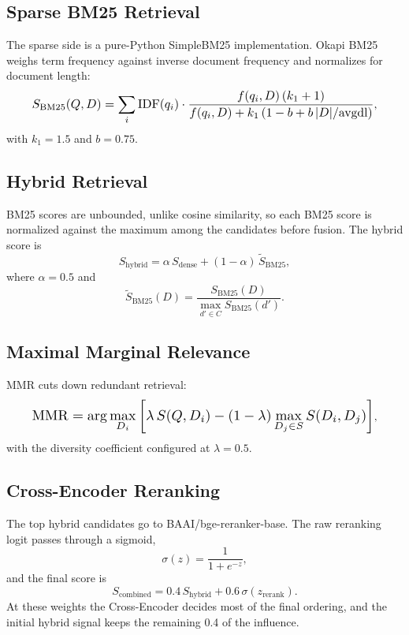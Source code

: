 \documentclass[10pt,twocolumn,letterpaper]{article}
\begin{document}
\subsection{Sparse BM25 Retrieval}
The sparse side is a pure-Python SimpleBM25 implementation. Okapi BM25 weighs term frequency against inverse document frequency and normalizes for document length:
\begin{equation}
\resizebox{0.9\columnwidth}{!}{$\displaystyle S_{\mathrm{BM25}}(Q, D) = \sum_i \mathrm{IDF}(q_i) \cdot \frac{f(q_i, D)\,(k_1 + 1)}{f(q_i, D) + k_1\,(1 - b + b\,|D|/\mathrm{avgdl})}$},
\end{equation}
with $k_1 = 1.5$ and $b = 0.75$.

\subsection{Hybrid Retrieval}
BM25 scores are unbounded, unlike cosine similarity, so each BM25 score is normalized against the maximum among the candidates before fusion. The hybrid score is
\begin{equation}
S_{\mathrm{hybrid}} = \alpha\, S_{\mathrm{dense}} + (1 - \alpha)\, \tilde{S}_{\mathrm{BM25}},
\end{equation}
where $\alpha = 0.5$ and
\begin{equation}
\tilde{S}_{\mathrm{BM25}}(D) = \frac{S_{\mathrm{BM25}}(D)}{\max_{d' \in C} S_{\mathrm{BM25}}(d')}.
\end{equation}

\subsection{Maximal Marginal Relevance}
MMR cuts down redundant retrieval:
\begin{equation}
\resizebox{0.9\columnwidth}{!}{$\displaystyle \mathrm{MMR} = \arg\max_{D_i} \left[ \lambda\, S(Q, D_i) - (1 - \lambda) \max_{D_j \in S} S(D_i, D_j) \right]$},
\end{equation}
with the diversity coefficient configured at $\lambda = 0.5$.

\subsection{Cross-Encoder Reranking}
The top hybrid candidates go to BAAI/bge-reranker-base. The raw reranking logit passes through a sigmoid,
\begin{equation}
\sigma(z) = \frac{1}{1 + e^{-z}},
\end{equation}
and the final score is
\begin{equation}
S_{\mathrm{combined}} = 0.4\, S_{\mathrm{hybrid}} + 0.6\, \sigma(z_{\mathrm{rerank}}).
\end{equation}
At these weights the Cross-Encoder decides most of the final ordering, and the initial hybrid signal keeps the remaining 0.4 of the influence.
\end{document}
